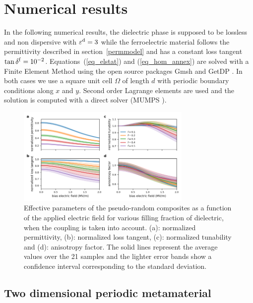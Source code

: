 \documentclass[%
 aip,
 amsmath,amssymb,
 reprint,%
]{revtex4-1}
\newcommand{\epsd}{\varepsilon^{\rm d}}
\begin{document}
\section{Numerical results}
In the following numerical results, the dielectric phase is supposed to be
lossless and non dispersive with $\epsd = 3$ while the ferroelectric material follows the
permittivity described in section~\ref{permmodel} and has a constant loss
tangent $\tan \delta^{\rm f} = 10^{-2}$.
Equations~(\ref{eq_elstat}) and (\ref{eq_hom_annex}) are solved with a Finite Element
Method using the open source packages Gmsh \cite{geuzaine_gmsh:_2009} and GetDP \cite{dular_general_1998}.
In both cases we use a square unit cell $\Omega$ of length $d$ with periodic boundary
conditions along $x$ and $y$. Second order Lagrange elements are used and the
solution is computed with a direct solver (MUMPS \cite{amestoy_fully_2001}).

\begin{figure}[!t]
 \centering
 \includegraphics[width=0.75\textwidth]{effpar_rand_cpl.png}
 \caption{Effective parameters of the pseudo-random composites as a function of the
  applied electric field for various filling fraction of dielectric, when the
  coupling is taken into account.
  (a): normalized permittivity, (b): normalized loss tangent, (c): normalized tunability and
  (d): anisotropy factor. The solid lines represent the average values
  over the 21 samples and the lighter error bands show a confidence interval corresponding to
  the standard deviation.}
 \label{eff_par_2Drand_TM}
\end{figure}
%
%
%


\subsection{Two dimensional periodic metamaterial}
\end{document}

